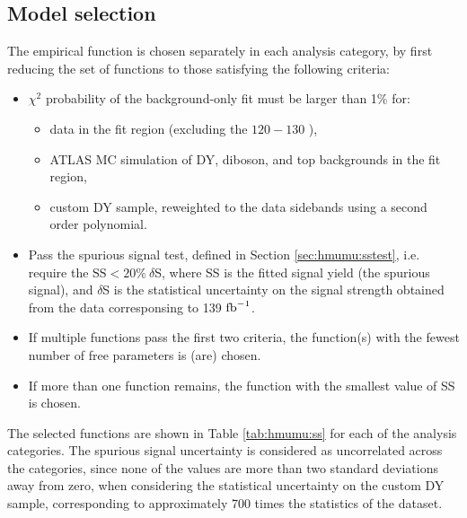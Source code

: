 \subsection{Model selection}
\label{sec:hmumu:model-sel}

The empirical function is chosen separately in each analysis
category, by first reducing the set of functions to those
satisfying the following criteria:
\begin{itemize}
\item $\chi^2$ probability of the background-only fit must
be larger than 1\% for:
\begin{itemize}
\item data in the fit region (excluding the $120-130$ \GeV),
\item ATLAS MC simulation of DY, diboson, and top backgrounds in the fit region,
\item custom DY sample, reweighted to the data sidebands using a second order polynomial.
\end{itemize}
\item Pass the spurious signal test, defined in Section \ref{sec:hmumu:sstest},
i.e. require the $\text{SS} < 20\%~\delta$S, where SS is the fitted signal
yield (the spurious signal), and $\delta$S is the statistical uncertainty
on the signal strength obtained from the data corresponsing to 139 $\text{fb}^{-1}$.
\item If multiple functions pass the first two criteria,
the function(s) with the fewest number of free parameters is (are)
chosen.
\item If more than one function remains, the function with the
smallest value of SS is chosen.
\end{itemize}
The selected functions are shown in Table \ref{tab:hmumu:ss}
for each of the analysis categories. The spurious signal uncertainty
is considered as uncorrelated across the categories, since none
of the values are more than two standard deviations away from zero,
when considering the statistical uncertainty on the custom DY sample,
corresponding to approximately 700 times the statistics of the
dataset.
